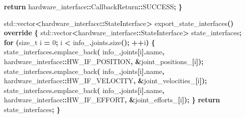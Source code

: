 \documentclass[
]{article}
\newenvironment{Shaded}{\begin{snugshade}}{\end{snugshade}}
\newcommand{\BuiltInTok}[1]{#1}
\newcommand{\ControlFlowTok}[1]{\textcolor[rgb]{0.13,0.29,0.53}{\textbf{#1}}}
\newcommand{\DataTypeTok}[1]{\textcolor[rgb]{0.13,0.29,0.53}{#1}}
\newcommand{\DecValTok}[1]{\textcolor[rgb]{0.00,0.00,0.81}{#1}}
\newcommand{\KeywordTok}[1]{\textcolor[rgb]{0.13,0.29,0.53}{\textbf{#1}}}
\newcommand{\NormalTok}[1]{#1}
\newcommand{\OperatorTok}[1]{\textcolor[rgb]{0.81,0.36,0.00}{\textbf{#1}}}
\newcommand{\VariableTok}[1]{\textcolor[rgb]{0.00,0.00,0.00}{#1}}
\begin{document}
\begin{Shaded}
\begin{Highlighting}[]
        \ControlFlowTok{return}\NormalTok{ hardware\_interface}\OperatorTok{::}\NormalTok{CallbackReturn}\OperatorTok{::}\NormalTok{SUCCESS}\OperatorTok{;}
    \OperatorTok{\}}

    \BuiltInTok{std::}\NormalTok{vector}\OperatorTok{\textless{}}\NormalTok{hardware\_interface}\OperatorTok{::}\NormalTok{StateInterface}\OperatorTok{\textgreater{}}\NormalTok{ export\_state\_interfaces}\OperatorTok{()} \KeywordTok{override} \OperatorTok{\{}
        \BuiltInTok{std::}\NormalTok{vector}\OperatorTok{\textless{}}\NormalTok{hardware\_interface}\OperatorTok{::}\NormalTok{StateInterface}\OperatorTok{\textgreater{}}\NormalTok{ state\_interfaces}\OperatorTok{;}
        \ControlFlowTok{for} \OperatorTok{(}\DataTypeTok{size\_t}\NormalTok{ i }\OperatorTok{=} \DecValTok{0}\OperatorTok{;}\NormalTok{ i }\OperatorTok{\textless{}} \VariableTok{info\_}\OperatorTok{.}\NormalTok{joints}\OperatorTok{.}\NormalTok{size}\OperatorTok{();} \OperatorTok{++}\NormalTok{i}\OperatorTok{)} \OperatorTok{\{}
\NormalTok{            state\_interfaces}\OperatorTok{.}\NormalTok{emplace\_back}\OperatorTok{(}
                \VariableTok{info\_}\OperatorTok{.}\NormalTok{joints}\OperatorTok{[}\NormalTok{i}\OperatorTok{].}\NormalTok{name}\OperatorTok{,}\NormalTok{ hardware\_interface}\OperatorTok{::}\NormalTok{HW\_IF\_POSITION}\OperatorTok{,} \OperatorTok{\&}\VariableTok{joint\_positions\_}\OperatorTok{[}\NormalTok{i}\OperatorTok{]);}
\NormalTok{            state\_interfaces}\OperatorTok{.}\NormalTok{emplace\_back}\OperatorTok{(}
                \VariableTok{info\_}\OperatorTok{.}\NormalTok{joints}\OperatorTok{[}\NormalTok{i}\OperatorTok{].}\NormalTok{name}\OperatorTok{,}\NormalTok{ hardware\_interface}\OperatorTok{::}\NormalTok{HW\_IF\_VELOCITY}\OperatorTok{,} \OperatorTok{\&}\VariableTok{joint\_velocities\_}\OperatorTok{[}\NormalTok{i}\OperatorTok{]);}
\NormalTok{            state\_interfaces}\OperatorTok{.}\NormalTok{emplace\_back}\OperatorTok{(}
                \VariableTok{info\_}\OperatorTok{.}\NormalTok{joints}\OperatorTok{[}\NormalTok{i}\OperatorTok{].}\NormalTok{name}\OperatorTok{,}\NormalTok{ hardware\_interface}\OperatorTok{::}\NormalTok{HW\_IF\_EFFORT}\OperatorTok{,} \OperatorTok{\&}\VariableTok{joint\_efforts\_}\OperatorTok{[}\NormalTok{i}\OperatorTok{]);}
        \OperatorTok{\}}
        \ControlFlowTok{return}\NormalTok{ state\_interfaces}\OperatorTok{;}
    \OperatorTok{\}}


\end{Highlighting}
\end{Shaded}
\end{document}
